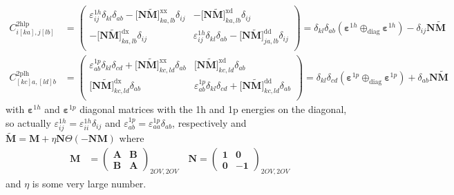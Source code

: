 \begin{align}
\label{c2h1p}
    {C}^{2 \mathrm{hlp}}_{i[ka],j[lb]} &= \begin{pmatrix}
{\varepsilon}^{1h}_{ij}\delta_{kl} \delta_{ab} - \bigl[\mathbf{N} \tilde{\mathbf{M}}\bigr]^{\mathrm{xx}}_{ka,lb} \delta _{ij} & - \bigl[\mathbf{N} \tilde{\mathbf{M}}\bigr]^{\mathrm{xd}}_{ka,lb} \delta _{ij} \\
- \bigl[\mathbf{N} \tilde{\mathbf{M}}\bigr]^{\mathrm{dx}}_{ka,lb}\delta _{ij} & {\varepsilon}^{1h}_{ij}\delta_{kl} \delta_{ab} - \bigl[\mathbf{N} \tilde{\mathbf{M}}\bigr]^{\mathrm{dd}}_{ja,lb} \delta _{ij} \\
\end{pmatrix} = \delta_{kl}\delta_{ab}\left(\bm{\varepsilon}^{1h}\oplus_{\text{diag}} \bm{\varepsilon}^{1h}\right) -\delta_{ij} \bm{N}\tilde{\mathbf{M}}\\
\label{c2p1h}
{C}^{2 \mathrm{plh}}_{[kc]a,[ld]b} &= \begin{pmatrix}
{\varepsilon}^{1p}_{ab}\delta_{kl} \delta_{cd} + \bigl[\mathbf{N} \tilde{\mathbf{M}}\bigr]^{\mathrm{xx}}_{kc,ld} \delta _{ab} &  \bigl[\mathbf{N} \tilde{\mathbf{M}}\bigr]^{\mathrm{xd}}_{kc,ld} \delta _{ab} \\ 
    \bigl[\mathbf{N} \tilde{\mathbf{M}}\bigr]^{\mathrm{dx}}_{kc,ld}\delta _{ab} & {\varepsilon}^{1p}_{ab}\delta_{kl} \delta_{cd} + \bigl[\mathbf{N} \tilde{\mathbf{M}}\bigr]^{\mathrm{dd}}_{kc,ld} \delta _{ab} \\
\end{pmatrix} = \delta_{kl}\delta_{cd}\left(\bm{\varepsilon}^{1p}\oplus_{\text{diag}} \bm{\varepsilon}^{1p}\right) +\delta_{ab} \bm{N}\tilde{\mathbf{M}}
\end{align}
with $\bm{\varepsilon}^{1h}$ and $\bm{\varepsilon}^{1p}$ diagonal matrices with the 1h and 1p energies on the diagonal, so actually $\varepsilon^{1h}_{ij} = \varepsilon^{1h}_{ii} \delta_{ij}$ and $\varepsilon^{1p}_{ab} = \varepsilon^{1p}_{aa} \delta_{ab}$, respectively and $\tilde{\bm{M}} = \bm{M} + \eta \bm{N}\Theta(-\bm{N}\bm{M})$ 
where
\begin{align}
\bm{M} &= \begin{pmatrix}
\bm{A} & \bm{B} \\
\bm{B} & \bm{A}
\end{pmatrix}_{2OV,2OV} \quad
\bm{N} = \begin{pmatrix}
\bm{1} & \bm{0} \\
\bm{0} & -\bm{1}
\end{pmatrix}_{2OV,2OV}
\end{align}
and $\eta$ is some very large number.
